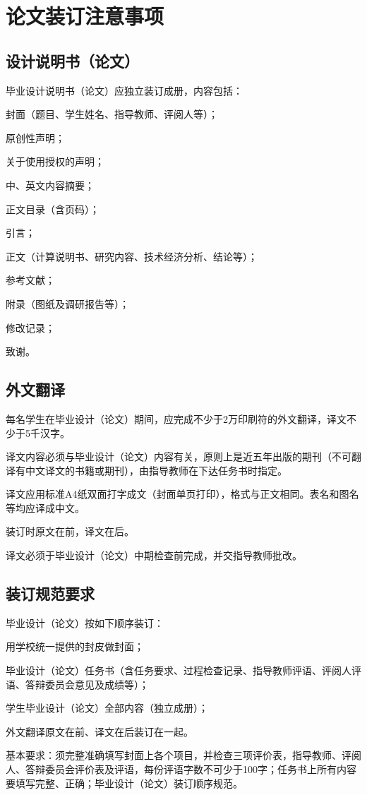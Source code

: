 
\chapter{论文装订注意事项}
\label{chap04}
\section{设计说明书（论文）}
毕业设计说明书（论文）应独立装订成册，内容包括：

封面（题目、学生姓名、指导教师、评阅人等）；

原创性声明；

关于使用授权的声明；

中、英文内容摘要；

正文目录（含页码）；

引言；

正文（计算说明书、研究内容、技术经济分析、结论等）；

参考文献；

附录（图纸及调研报告等）；

修改记录；

致谢。

\section{外文翻译}
每名学生在毕业设计（论文）期间，应完成不少于2万印刷符的外文翻译，译文不少于5千汉字。

译文内容必须与毕业设计（论文）内容有关，原则上是近五年出版的期刊（不可翻译有中文译文的书籍或期刊），由指导教师在下达任务书时指定。

译文应用标准A4纸双面打字成文（封面单页打印），格式与正文相同。表名和图名等均应译成中文。

装订时原文在前，译文在后。

译文必须于毕业设计（论文）中期检查前完成，并交指导教师批改。

\section{装订规范要求}
毕业设计（论文）按如下顺序装订：

用学校统一提供的封皮做封面；

毕业设计（论文）任务书（含任务要求、过程检查记录、指导教师评语、评阅人评语、答辩委员会意见及成绩等）；

学生毕业设计（论文）全部内容（独立成册）；

外文翻译原文在前、译文在后装订在一起。

基本要求：须完整准确填写封面上各个项目，并检查三项评价表，指导教师、评阅人、答辩委员会评价表及评语，每份评语字数不可少于100字；任务书上所有内容要填写完整、正确；毕业设计（论文）装订顺序规范。


